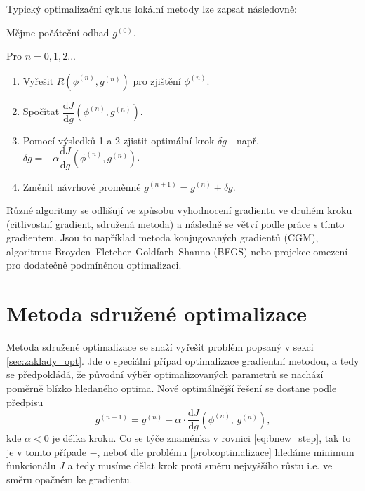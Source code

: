 Typický optimalizační cyklus lokální metody lze zapsat následovně:
\begin{addmargin}[3em]{2em}%
	\begin{description}
	\item 	Mějme počáteční odhad $ g^{(0)} $.
	\item 	Pro $ n=0,1,2... $
	 	\begin{enumerate}
			\item Vyřešit $ R(\phi^{(n)},g^{(n)}) $ pro zjištění $ \phi^{(n)} $.
			\item Spočítat $ \dfrac{\mathrm{d}J}{\mathrm{d}g}(\phi^{(n)},g^{(n)}) $.
			\item Pomocí výsledků 1 a 2 zjistit optimální krok $ \delta g $ - např. $ \delta g = -\alpha \dfrac{\mathrm{d}J}{\mathrm{d}g}(\phi^{(n)},g^{(n)}) $.
			\item Změnit návrhové proměnné $ g^{(n+1)} = g^{(n)} + \delta g $.
		\end{enumerate}
	\end{description}
\end{addmargin}
Různé algoritmy se odlišují ve způsobu vyhodnocení gradientu ve druhém kroku (citlivostní gradient, sdružená metoda) a následně se větví podle práce s tímto gradientem. Jsou to například metoda konjugovaných gradientů (CGM)\cite{hestenes1952methods}, algoritmus Broyden–Fletcher–Goldfarb–Shanno (BFGS)\cite{fletcher1987practical} nebo projekce omezení \cite{rosen1960gradient} pro dodatečně podmíněnou optimalizaci.  
\newpage
\section{Metoda sdružené optimalizace}

Metoda sdružené optimalizace se snaží vyřešit problém popsaný v sekci \ref{sec:zaklady_opt}. 
Jde o speciální případ optimalizace gradientní metodou, a tedy se předpokládá, že původní výběr optimalizovaných parametrů se nachází poměrně blízko hledaného optima. Nové optimálnější řešení se dostane podle předpisu
\begin{equation}\label{eq:bnew_step}
g^{(n+1)}=g^{(n)}-\alpha\cdot\dfrac{\mathrm{d}J}{\mathrm{d}g}(\phi^{(n)}, \, g^{(n)}),
\end{equation}
kde $ \alpha < 0 $ je délka kroku. 
Co se týče znaménka v rovnici \ref{eq:bnew_step}, tak to je v tomto případe $ - $, neboť dle problému \ref{prob:optimalizace} hledáme minimum funkcionálu $ J $ a tedy musíme dělat krok proti směru nejvyššího růstu i.e. ve směru opačném ke gradientu.

